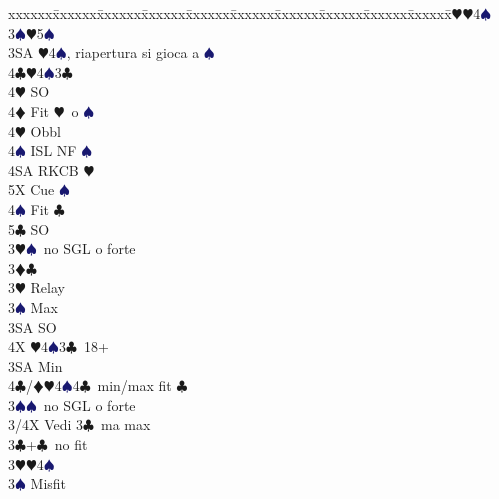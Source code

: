 \documentclass[a4paper,italian]{article}
\newcommand{\BC}{\textcolor{OliveGreen}{$\clubsuit$}}
\newcommand{\BD}{\textcolor{RedOrange}{$\vardiamondsuit$}}
\newcommand{\BH}{\textcolor{Red2}{$\varheartsuit${}}}
\newcommand{\BS}{\textcolor{MidnightBlue}{$\spadesuit${}}}
\newenvironment{bidtable}
{\begin{tabbing}

    xxxxxx\=xxxxxx\=xxxxxx\=xxxxxx\=xxxxxx\=xxxxxx\=xxxxxx\=xxxxxx\=xxxxxx\=xxxxxx\=\kill}
{\end{tabbing} }%
\begin{document}
\begin{multicols}{2}
\begin{bidtable}
                                            3\BH {}\BH 4\BS \\
                                            3\BS {}\BH 5\BS \\
                                            3SA \BH 4\BS , riapertura si gioca a \BS \\
                                            4\BC {}\BH 4\BS 3\BC \+\\
                                            4\BH \> SO\\
                                            4\BD \> Fit \BH\ o \BS \+\\
                                            4\BH \> Obbl\+\\
                                            4\BS \> ISL NF \BS \\
                                            4SA \> RKCB \BH \\
                                            5X \> Cue \BS \-\-\\
                                            4\BS \> Fit \BC \\
                                            5\BC \> SO\-\-\\
                                            3\BH {}\BS\ no SGL o forte\-\\
                                            3\BD {}\BC \+\\
                                            3\BH \> Relay\+\\
                                            3\BS \> Max\+\\
                                            3SA \> SO\+\\
                                            4X \BH4\BS3\BC\ 18+\-\-\\
                                            3SA \> Min\\
                                            4\BC/\BD {}\BH 4\BS 4\BC\ min/max fit \BC \-\\
                                            3\BS {}\BS\ no SGL o forte\-\\
                                            3/4X \> Vedi 3\BC\ ma max\-\\
                                            3\BC {}+\BC\ no fit\+\\
                                            3\BH {}\BH 4\BS \+\\
                                            3\BS \> Misfit\\

\end{bidtable}
\end{multicols}
\end{document}
